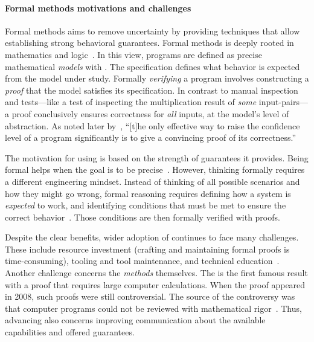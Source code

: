 \paragraph*{Formal methods motivations and challenges}
Formal methods aims to remove uncertainty by providing
techniques that allow establishing strong behavioral guarantees. Formal
methods is deeply rooted in mathematics and
logic~\cite{shankar2023}. In this view, programs are defined as precise
mathematical \emph{models} with . The specification defines
what behavior is expected from the model under study. Formally
\emph{verifying} a program involves constructing a
\emph{proof} that the model satisfies its specification.
In contrast to manual inspection and tests---like a test
of inspecting the multiplication result of \emph{some} input-pairs---a proof
conclusively ensures correctness for \emph{all} inputs, at the model's level of
abstraction. As noted later by~\textcite{dijkstra1972}, \enquote{{[t]he only
effective way to raise the confidence level of a program significantly is to
give a convincing proof of its correctness.}}

The motivation for using  is based on the strength of
guarantees it provides. Being formal helps when the goal is to be
precise~\cite{leino2023}. However, thinking formally requires a different
engineering mindset. Instead of thinking of all possible scenarios and how they
might go wrong, formal reasoning requires defining how a system is
\emph{expected} to work, and identifying conditions that must be met to ensure
the correct behavior~\cite{aws2024}. Those conditions are then formally
verified with proofs.

Despite the clear benefits, wider adoption of  continues to
face many challenges. These include \eg resource investment (crafting and
maintaining formal proofs is time-consuming), tooling and tool maintenance, and
technical education~\cite{beek2024}. Another challenge concerns the
\emph{methods} themselves. The  is the first famous
result with a proof that requires large computer calculations. When the proof
appeared in 2008, such proofs were still controversial. The source of the
controversy was that computer programs could not be reviewed with mathematical
rigor~\cite{gonthier2008}. Thus, advancing  also concerns
improving communication about the available capabilities and offered guarantees.


